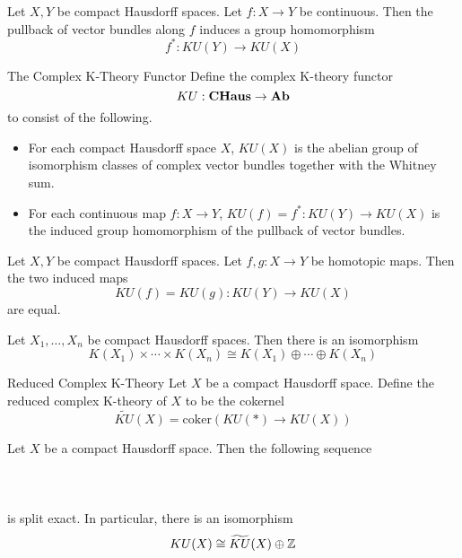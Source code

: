 \documentclass[a4paper]{article}
\begin{document}
\begin{prp}{}{} Let $X,Y$ be compact Hausdorff spaces. Let $f:X\to Y$ be continuous. Then the pullback of vector bundles along $f$ induces a group homomorphism $$f^\ast:KU(Y)\to KU(X)$$
\end{prp}

\begin{defn}{The Complex K-Theory Functor}{} Define the complex K-theory functor $$KU:\bold{CHaus}\to\bold{Ab}$$ to consist of the following. 
\begin{itemize}
\item For each compact Hausdorff space $X$, $KU(X)$ is the abelian group of isomorphism classes of complex vector bundles together with the Whitney sum. 
\item For each continuous map $f:X\to Y$, $KU(f)=f^\ast:KU(Y)\to KU(X)$ is the induced group homomorphism of the pullback of vector bundles. 
\end{itemize}
\end{defn}

\begin{prp}{}{} Let $X,Y$ be compact Hausdorff spaces. Let $f,g:X\to Y$ be homotopic maps. Then the two induced maps $$KU(f)=KU(g):KU(Y)\to KU(X)$$ are equal. 
\end{prp}

\begin{prp}{}{} Let $X_1,\dots,X_n$ be compact Hausdorff spaces. Then there is an isomorphism $$K(X_1)\times\cdots\times K(X_n)\cong K(X_1)\oplus\cdots\oplus K(X_n)$$
\end{prp}

\begin{defn}{Reduced Complex K-Theory}{} Let $X$ be a compact Hausdorff space. Define the reduced complex K-theory of $X$ to be the cokernel $$\widetilde{KU}(X)=\text{coker}(KU(\ast)\to KU(X))$$
\end{defn}

\begin{prp}{}{} Let $X$ be a compact Hausdorff space. Then the following sequence \\~\\
\\~\\
is split exact. In particular, there is an isomorphism $$KU(X)\cong\widetilde{KU}(X)\oplus\mathbb{Z}$$
\end{prp}
\end{document}

